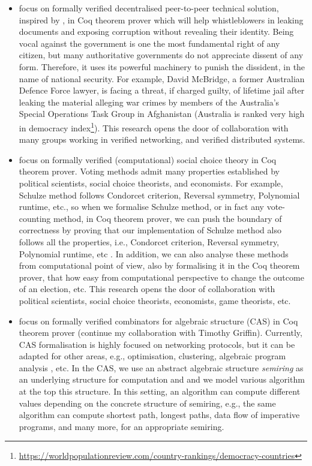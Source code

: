 \documentclass[a4paper]{article}
\begin{document}
\begin{itemize}
\item focus on formally verified decentralised peer-to-peer technical solution, inspired by 
\cite{liu2004linkable, Clarke2001, schimmer2009peer}, in Coq theorem prover which will help 
whistleblowers in leaking documents and exposing 
corruption without revealing their identity. 
Being vocal against the government is one the most fundamental right of any citizen, but many 
authoritative governments do not appreciate dissent of any form. Therefore, it uses 
its powerful machinery to punish the dissident, in the name of national security. For example,
David McBridge, a former Australian Defence Force lawyer,  
is facing a threat, if charged guilty, of lifetime jail after
leaking the material alleging war crimes by members of the Australia's Special Operations
Task Group in Afghanistan (Australia is ranked very high in 
democracy index\footnote{\url{https://worldpopulationreview.com/country-rankings/democracy-countries}}). 
This research opens the door of collaboration with many groups working in verified 
networking, and verified distributed systems. 



\item focus on formally verified (computational) social choice theory in Coq theorem prover. 
	Voting methods admit many properties established by political scientists, social choice theorists, 
	and economists. For example, Schulze method follows Condorcet criterion, Reversal symmetry,
	Polynomial runtime, etc., so when we formalise Schulze method, or in fact any vote-counting method,
	in Coq theorem prover, we can push the boundary of correctness by proving that our 
	implementation of Schulze method also follows all the properties, i.e.,  Condorcet criterion, Reversal symmetry,
	Polynomial runtime, etc  \cite{tiwari2021machine}. 
	In addition, we can also analyse these 
	methods from computational point of view, also by formalising it in the Coq theorem prover, 
	that how easy from computational perspective to change the outcome of an election, etc. 
	This research opens the door of collaboration with political scientists, 
	social choice theorists, economists, game theorists, etc. 

	

\item focus on formally verified combinators for algebraic structure (CAS) in Coq theorem prover 
	(continue my collaboration with Timothy Griffin). 
	Currently, CAS formalisation is highly focused on networking protocols, but it can be 
	adapted for other areas, e.g., optimisation, clustering, algebraic program 
	analysis , etc. In the CAS, we use an abstract algebraic structure 
	\emph{semiring} as an underlying structure
	for computation and and we model various algorithm at the top this 
	structure. In this setting, an algorithm can compute different values depending 
	on the concrete structure of semiring, e.g., the same algorithm 
	can compute shortest path, longest paths, 
	data flow of imperative programs, and many more, \cite{gondran2008graphs} 
	for an appropriate semiring.
	

\end{itemize}
\end{document}
